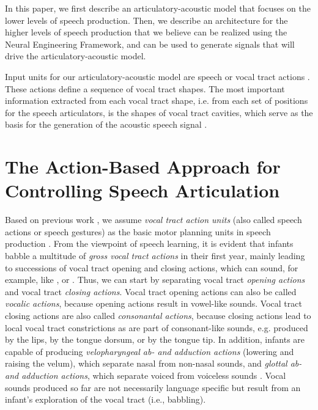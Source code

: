 \documentclass[conference]{IEEEtran}
\let\ipa\textipa
\begin{document}
In this paper, we first describe an articulatory-acoustic model
that focuses on the lower levels of speech production.
Then, we describe an architecture for the higher levels
of speech production that we believe can be realized
using the Neural Engineering Framework,
and can be used to generate signals that
will drive the articulatory-acoustic model.

Input units for our articulatory-acoustic model
are speech or vocal tract actions
\cite{kroger1993,kroger2010}. These actions define a sequence of vocal
tract shapes. The most important information extracted from each vocal
tract shape, i.e. from each set of positions
for the speech articulators, is the
shapes of vocal tract cavities, which serve as the basis for the
generation of the acoustic speech signal \cite{kroger1993}.

\section{The Action-Based Approach for Controlling Speech
  Articulation}

Based on previous work \cite{saltzman1989,goldstein2006}, we assume
\textit{vocal tract action units} (also called speech actions or
speech gestures) as the basic motor planning units in speech
production \cite{kroger2010}. From the viewpoint of speech learning, it
is evident that infants babble a multitude of
\textit{gross vocal tract actions} in their first year,
mainly leading to successions of
vocal tract opening and closing actions,
which can sound, for example,
like \ipa{[bAbA]}, \ipa{[dAdA]} or \ipa{[gAgA]}
\cite{kroger2009,kroger2014}. Thus, we
can start by separating vocal tract \textit{opening actions} and vocal
tract \textit{closing actions}. Vocal tract opening actions can also
be called \textit{vocalic actions}, because opening actions result in
vowel-like sounds. Vocal tract closing actions are also called
\textit{consonantal actions}, because closing actions
lead to local vocal tract constrictions
as are part of consonant-like sounds,
e.g. produced by the lips, by the tongue dorsum, or by
the tongue tip. In addition, infants are capable of producing
\textit{velopharyngeal ab- and adduction actions} (lowering and
raising the velum), which separate nasal from
non-nasal sounds, and \textit{glottal ab- and adduction actions},
which separate voiced from voiceless sounds \cite{kuhl2004}.
Vocal sounds produced so far are not
necessarily language specific but result from an infant's exploration of
the vocal tract (i.e., babbling).
\end{document}
